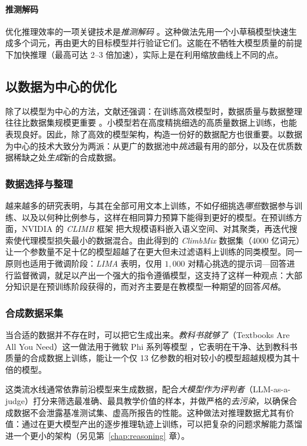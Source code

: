 \paragraph{推测解码} 优化推理效率的一项关键技术是\emph{推测解码} \citep{leviathan2023fast}。这种做法先用一个小草稿模型快速生成多个词元，再由更大的目标模型并行验证它们。这能在不牺牲大模型质量的前提下加快推理（最高可达 2–3 倍加速），实际上是在利用缩放曲线上不同的点。



\subsection{以数据为中心的优化}
除了以模型为中心的方法，文献还强调：在训练高效模型时，数据质量与数据整理往往比数据集规模更重要 \citep{luo-etal-2025-survey}。小模型若在高度精挑细选的高质量数据上训练，也能表现良好。因此，除了高效的模型架构，构造一份好的数据配方也很重要。以数据为中心的技术大致分为两派：从更广的数据池中\emph{挑选}最有用的部分，以及在优质数据稀缺之处\emph{生成}新的合成数据。

\subsubsection{数据选择与整理}
越来越多的研究表明，与其在全部可用文本上训练，不如仔细挑选\emph{哪些}数据参与训练、以及以何种比例参与，这样在相同算力预算下能得到更好的模型。在预训练方面，NVIDIA 的 \emph{CLIMB} 框架 \citep{diao2026nemotron} 把大规模语料嵌入语义空间、对其聚类，再迭代搜索使代理模型损失最小的数据混合。由此得到的 \emph{ClimbMix} 数据集（4000 亿词元）让一个参数量不足十亿的模型超越了在更大但未过滤语料上训练的同类模型。同一原则也适用于微调阶段：\emph{LIMA} \citep{zhou2023lima} 表明，仅用 $1{,}000$ 对精心挑选的提示词—回答进行监督微调，就足以产出一个强大的指令遵循模型，这支持了这样一种观点：大部分知识是在预训练阶段获得的，而对齐主要是在教模型一种期望的回答\emph{风格}。

\subsubsection{合成数据采集}
当合适的数据并不存在时，可以把它生成出来。{\em 教科书就够了}（Textbooks Are All You Need）这一做法用于微软 Phi 系列等模型 \citep{gunasekar2024textbooks}，它表明在干净、达到教科书质量的合成数据上训练，能让一个仅 13 亿参数的相对较小的模型超越规模为其十倍的模型。

这类流水线通常依靠前沿模型来生成数据，配合{\em 大模型作为评判者}（LLM-as-a-judge）打分来筛选最准确、最具教学价值的样本，并做严格的\emph{去污染}，以确保合成数据不会泄露基准测试集、虚高所报告的性能。这种做法对推理数据尤其有价值：通过在更大模型产出的逐步推理轨迹上训练，可以把复杂的问题求解能力蒸馏进一个更小的架构（另见第~\ref{chap:reasoning} 章）\citep{muennighoff2025s1, arora2026training}。


